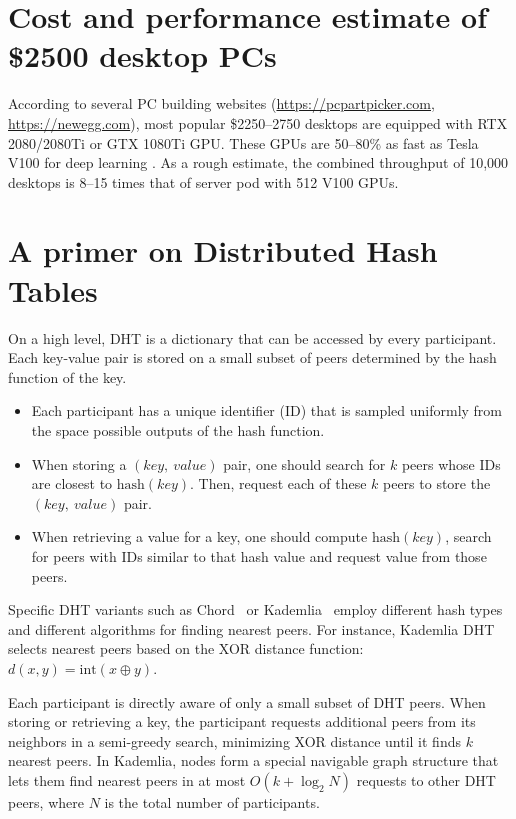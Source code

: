 
\section{Cost and performance estimate of \$2500 desktop PCs}
\vspace{-2px}

According to several PC building websites (\url{https://pcpartpicker.com}, \url{https://newegg.com}), most popular \$2250--2750 desktops are equipped with RTX 2080/2080Ti or GTX 1080Ti GPU. These GPUs are 50--80\% as fast as Tesla V100 for deep learning \cite{lambdabenchmarks}. As a rough estimate, the combined throughput of 10,000 desktops is 8--15 times that of server pod with 512 V100 GPUs.

\section{A primer on Distributed Hash Tables}
\vspace{-2px}

On a high level, DHT is a dictionary that can be accessed by every participant. Each key-value pair is stored on a small subset of peers determined by the hash function of the key.
\begin{itemize}
    \item Each participant has a unique identifier (ID) that is sampled uniformly from the space possible outputs of the hash function.
    \item When storing a $(key,\ value)$ pair, one should search for $k$ peers whose IDs are closest to $\mathrm{hash}(key)$. Then, request each of these $k$ peers to store the $(key,\ value)$ pair.
    \item When retrieving a value for a key, one should compute $\mathrm{hash}(key)$, search for peers with IDs similar to that hash value and request value from those peers.
\end{itemize}

Specific DHT variants such as Chord~\cite{chord} or Kademlia~\cite{kademlia} employ different hash types and different algorithms for finding nearest peers. For instance, Kademlia DHT selects nearest peers based on the XOR distance function: $d(x, y) = \mathrm{int}(x \oplus y)$.

Each participant is directly aware of only a small subset of DHT peers. When storing or retrieving a key, the participant requests additional peers from its neighbors in a semi-greedy search, minimizing XOR distance until it finds $k$ nearest peers. In Kademlia, nodes form a special navigable graph structure that lets them find nearest peers in at most $O(k + \log_2 N)$ requests to other DHT peers, where $N$ is the total number of participants. 

